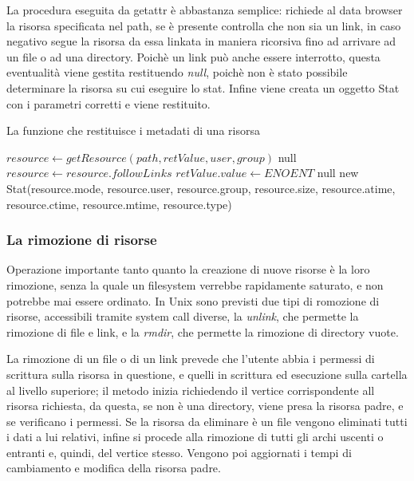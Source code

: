 La procedura eseguita da getattr è abbastanza semplice: richiede al data browser la risorsa specificata nel path, se è presente controlla che non sia un link, in caso negativo segue la risorsa da essa linkata in maniera ricorsiva fino ad arrivare ad un file o ad una directory. Poichè un link può anche essere interrotto, questa eventualità viene gestita restituendo \emph{null}, poichè non è stato possibile determinare la risorsa su cui eseguire lo stat. Infine viene creata un oggetto Stat con i parametri corretti e viene restituito.
\begin{algorithm}
\begin{algorithmic}[5]
\caption{La funzione che restituisce i metadati di una risorsa}
	\State $resource \gets getResource(path, retValue, user, group)$
		\State \Return null
	\EndIf
		\State $resource \gets resource.followLinks$
	\EndIf
		\State $retValue.value \gets ENOENT$
		\State \Return null
	\EndIf
	\State \Return new Stat(resource.mode, resource.user, resource.group, resource.size, resource.atime, resource.ctime, resource.mtime, resource.type)
\EndFunction
\end{algorithmic}
\end{algorithm}

\subsubsection{La rimozione di risorse}
Operazione importante tanto quanto la creazione di nuove risorse è la loro rimozione, senza la quale un filesystem verrebbe rapidamente saturato, e non potrebbe mai essere ordinato. In Unix sono previsti due tipi di romozione di risorse, accessibili tramite system call diverse, la \emph{unlink}, che permette la rimozione di file e link, e la \emph{rmdir}, che permette la rimozione di directory vuote. 

La rimozione di un file o di un link prevede che l'utente abbia i permessi di scrittura sulla risorsa in questione, e quelli in scrittura ed esecuzione sulla cartella al livello superiore; il metodo inizia richiedendo il vertice corrispondente all risorsa richiesta, da questa, se non è una directory, viene presa la risorsa padre, e se verificano i permessi. Se la risorsa da eliminare è un file vengono eliminati tutti i dati a lui relativi, infine si procede alla rimozione di tutti gli archi uscenti o entranti e, quindi, del vertice stesso. Vengono poi aggiornati i tempi di cambiamento e modifica della risorsa padre.

